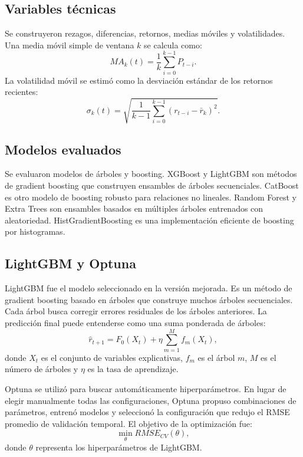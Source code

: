 \documentclass[12pt,letterpaper]{article}
\begin{document}
\subsection{Variables técnicas}
Se construyeron rezagos, diferencias, retornos, medias móviles y volatilidades. Una media móvil simple de ventana $k$ se calcula como:
\begin{equation}
MA_k(t)=\frac{1}{k}\sum_{i=0}^{k-1}P_{t-i}.
\end{equation}
La volatilidad móvil se estimó como la desviación estándar de los retornos recientes:
\begin{equation}
\sigma_k(t)=\sqrt{\frac{1}{k-1}\sum_{i=0}^{k-1}\left(r_{t-i}-\bar{r}_k\right)^2}.
\end{equation}

\subsection{Modelos evaluados}
Se evaluaron modelos de árboles y boosting. XGBoost y LightGBM son métodos de gradient boosting que construyen ensambles de árboles secuenciales. CatBoost es otro modelo de boosting robusto para relaciones no lineales. Random Forest y Extra Trees son ensambles basados en múltiples árboles entrenados con aleatoriedad. HistGradientBoosting es una implementación eficiente de boosting por histogramas.

\subsection{LightGBM y Optuna}
LightGBM fue el modelo seleccionado en la versión mejorada. Es un método de gradient boosting basado en árboles que construye muchos árboles secuenciales. Cada árbol busca corregir errores residuales de los árboles anteriores. La predicción final puede entenderse como una suma ponderada de árboles:
\begin{equation}
\hat{r}_{t+1}=F_0(X_t)+\eta\sum_{m=1}^{M}f_m(X_t),
\end{equation}
donde $X_t$ es el conjunto de variables explicativas, $f_m$ es el árbol $m$, $M$ es el número de árboles y $\eta$ es la tasa de aprendizaje.

Optuna se utilizó para buscar automáticamente hiperparámetros. En lugar de elegir manualmente todas las configuraciones, Optuna propuso combinaciones de parámetros, entrenó modelos y seleccionó la configuración que redujo el RMSE promedio de validación temporal. El objetivo de la optimización fue:
\begin{equation}
\min_{\theta} RMSE_{CV}(\theta),
\end{equation}
donde $\theta$ representa los hiperparámetros de LightGBM.
\end{document}
